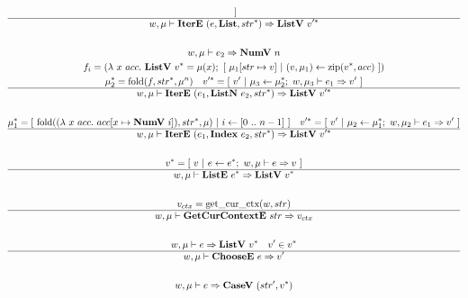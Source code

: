 \begin{gather*}
    ~ ] \\
  \hline
  w, \mu \vdash \itere ~ (e, \listiter, \seq{str}) \Rightarrow \listv ~ \seq{v'} \\
%
\newline \\
  w, \mu \vdash e_2 \Rightarrow \numv ~ n \\
  f_i =
    (\lambda ~ x ~ acc. ~
      \listv ~ \seq v = \mu(x); ~
      [ ~ \mu_1[str \mapsto v] ~ | ~ (v, \mu_1) \leftarrow \zip (\seq v, acc) ~ ]
    )
  \\
  \seq{\mu_2} = \fold(f, \seq{str}, \mu^n) \quad
  \seq{v'} =
    [ ~
      v'
    ~ | ~
      \mu_3 \leftarrow \seq {\mu_2}; ~ w, \mu_3 \vdash e_1 \Rightarrow v'
    ~ ] \\
  \hline
  w, \mu \vdash \itere ~ (e_1, \listniter ~ e_2, \seq{str}) \Rightarrow \listv ~ \seq{v'} \\
%
\newline \\
  \seq{\mu_1} =
    [ ~
      \fold(
        (\lambda ~ x ~ acc. ~ acc[x \mapsto \numv ~ i]),
        \seq{str},
        \mu
      )
    ~ | ~
      i \leftarrow [0 ~ .. ~ n-1]
    ~ ]
  \quad
  \seq{v'} =
    [ ~
      v'
    ~ | ~
      \mu_2 \leftarrow \seq {\mu_1}; ~ w, \mu_2 \vdash e_1 \Rightarrow v'
    ~ ] \\
  \hline
  w, \mu \vdash \itere ~ (e_1, \listidxiter ~ e_2, \seq{str}) \Rightarrow \listv ~ \seq{v'} \\
%
\newline \\
  \seq{v} = [ ~ v ~ | ~ e \leftarrow \seq{e}; ~ w, \mu \vdash e \Rightarrow v ~ ] \\
  \hline
  w, \mu \vdash \liste ~ \seq{e} \Rightarrow \listv ~ \seq{v} \\
%
\newline \\
  v_{ctx} = \getcurctx(w, str) \\
  \hline
  w, \mu \vdash \getcurctxe ~ str \Rightarrow v_{ctx} \\
%
\newline \\
  w, \mu \vdash e \Rightarrow \listv ~ \seq{v} \quad
  v' \in \seq{v} \\
  \hline
  w, \mu \vdash \choosee ~ e \Rightarrow v' \\
%
\newline \\
  w, \mu \vdash e \Rightarrow \casev ~ (str', \seq{v}) \\

\end{gather*}

